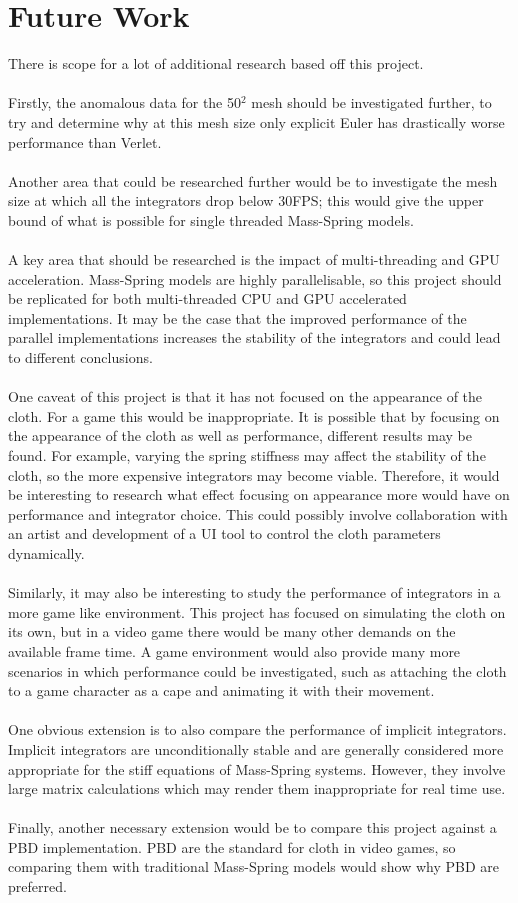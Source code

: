 \section{Future Work}
There is scope for a lot of additional research based off this project.
\\\\Firstly, the anomalous data for the 50$^{2}$ mesh should be investigated further, to try and determine why at this mesh size only explicit Euler has drastically worse performance than Verlet.
\\\\Another area that could be researched further would be to investigate the mesh size at which all the integrators drop below 30FPS; this would give the upper bound of what is possible for single threaded Mass-Spring models.
\\\\A key area that should be researched is the impact of multi-threading and GPU acceleration. Mass-Spring models are highly parallelisable, so this project should be replicated for both multi-threaded CPU and GPU accelerated implementations. It may be the case that the improved performance of the parallel implementations increases the stability of the integrators and could lead to different conclusions.
\\\\One caveat of this project is that it has not focused on the appearance of the cloth. For a game this would be inappropriate. It is possible that by focusing on the appearance of the cloth as well as performance, different results may be found. For example, varying the spring stiffness may affect the stability of the cloth, so the more expensive integrators may become viable. Therefore, it would be interesting to research what effect focusing on appearance more would have on performance and integrator choice. This could possibly involve collaboration with an artist and development of a UI tool to control the cloth parameters dynamically.
\\\\Similarly, it may also be interesting to study the performance of integrators in a more game like environment. This project has focused on simulating the cloth on its own, but in a video game there would be many other demands on the available frame time. A game environment would also provide many more scenarios in which performance could be investigated, such as attaching the cloth to a game character as a cape and animating it with their movement.
\\\\One obvious extension is to also compare the performance of implicit integrators. Implicit integrators are unconditionally stable and are generally considered more appropriate for the stiff equations of Mass-Spring systems. However, they involve large matrix calculations which may render them inappropriate for real time use.
\\\\Finally, another necessary extension would be to compare this project against a PBD implementation. PBD are the standard for cloth in video games, so comparing them with traditional Mass-Spring models would show why PBD are preferred.